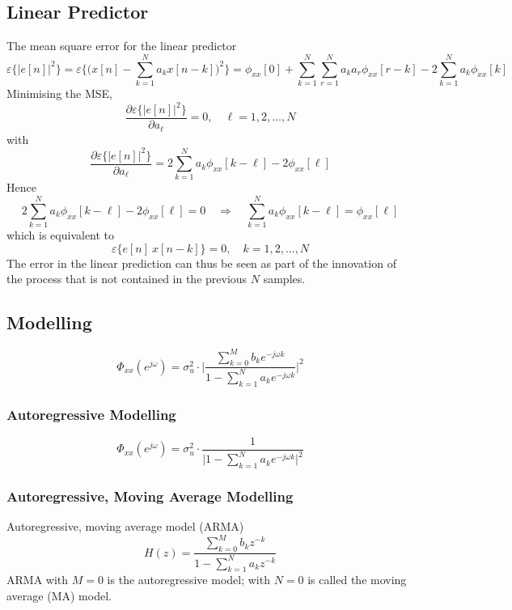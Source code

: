 \subsection{Linear Predictor}
The mean square error for the linear predictor
\[
    \varepsilon\{\lvert e[n] \rvert^2\} = \varepsilon \bigg\{ \bigg( x[n] - \sum_{k=1}^{N} a_k x[n-k] \bigg)^2 \bigg\} = \phi_{xx}[0] + \sum_{k=1}^{N}\sum_{r=1}^N a_k a_r \phi_{xx}[r-k] - 2 \sum_{k=1}^N a_k \phi_{xx}[k]
\]
Minimising the MSE,
\[
    \frac{\partial \varepsilon\{\lvert e[n] \rvert^2\}}{\partial a_{\ell}} = 0, \quad \ell = 1, 2,..., N
\]
with
\[
    \frac{\partial \varepsilon\{\lvert e[n] \rvert^2\}}{\partial a_{\ell}} = 2\sum_{k=1}^N a_k \phi_{xx}[k-\ell] - 2\phi_{xx}[\ell]
\]
Hence
\[
    2\sum_{k=1}^N a_k \phi_{xx}[k-\ell] - 2\phi_{xx}[\ell] = 0 
    \quad \Rightarrow \quad
    \boxed{\sum_{k=1}^N a_k \phi_{xx}[k-\ell] = \phi_{xx}[\ell]}
\]
which is equivalent to
\[
    \varepsilon \{e[n] \ x[n-k] \} = 0, \quad k = 1, 2, ..., N
\]
The error in the linear prediction can thus be seen as part of the innovation of the process that is not contained in the previous $N$ samples.

\subsection{Modelling}
\[
    \Phi_{xx}(e^{j\omega}) = \sigma_u^2 \cdot \bigg \lvert \frac{\sum_{k=0}^M b_k e^{-j\omega k}}{1-\sum_{k=1}^N a_k e^{-j\omega k}} \bigg\rvert^2
\]
\subsubsection{Autoregressive Modelling}
\[
    \Phi_{xx}(e^{j\omega}) = \sigma_u^2 \cdot  \frac{1}{\lvert 1-\sum_{k=1}^N a_k e^{-j\omega k}\rvert^2}
\]
\subsubsection{Autoregressive, Moving Average Modelling}
Autoregressive, moving average model (ARMA)
\[
    H(z) = \frac{\sum_{k=0}^M b_k z^{-k}}{1-\sum_{k=1}^N a_k z^{-k}}
\]
ARMA with $M=0$ is the autoregressive model; with $N=0$ is called the moving average (MA) model.

